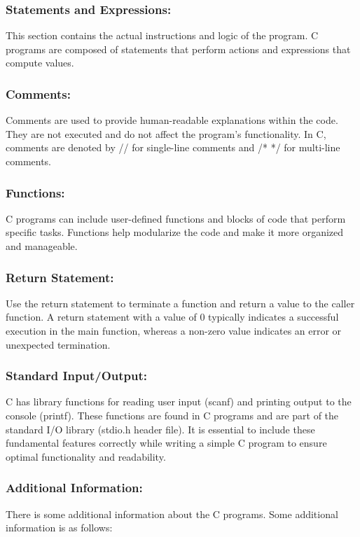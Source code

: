 \subsubsection{Statements and Expressions:}
This section contains the actual instructions and logic of the program. C programs are composed of statements that perform actions and expressions that compute values.

\subsubsection{Comments:}
Comments are used to provide human-readable explanations within the code. They are not executed and do not affect the program's functionality. In C, comments are denoted by // for single-line comments and /* */ for multi-line comments.

\subsubsection{Functions:}
C programs can include user-defined functions and blocks of code that perform specific tasks. Functions help modularize the code and make it more organized and manageable.

\subsubsection{Return Statement:}
Use the return statement to terminate a function and return a value to the caller function. A return statement with a value of 0 typically indicates a successful execution in the main function, whereas a non-zero value indicates an error or unexpected termination.

\subsubsection{Standard Input/Output:}
C has library functions for reading user input (scanf) and printing output to the console (printf). These functions are found in C programs and are part of the standard I/O library (stdio.h header file). It is essential to include these fundamental features correctly while writing a simple C program to ensure optimal functionality and readability.

\subsubsection{Additional Information:}
There is some additional information about the C programs. Some additional information is as follows:

